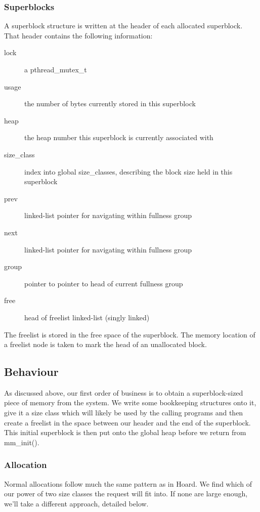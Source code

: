 \documentclass{article}
\begin{document}
\subsubsection{Superblocks}
A superblock structure is written at the header of each allocated superblock.
That header contains the following information:
\begin{description}
    \item[lock] a pthread\_mutex\_t
    \item[usage] the number of bytes currently stored in this superblock
    \item[heap] the heap number this superblock is currently associated with
    \item[size\_class] index into global size\_classes, describing the block
        size held in this superblock
    \item[prev] linked-list pointer for navigating within fullness group
    \item[next] linked-list pointer for navigating within fullness group
    \item[group] pointer to pointer to head of current fullness group
    \item[free] head of freelist linked-list (singly linked)
\end{description}

The freelist is stored in the free space of the superblock. The memory
location of a freelist node is taken to mark the head of an unallocated block.

\subsection {Behaviour}
As discussed above, our first order of business is to obtain a superblock-sized
piece of memory from the system. We write some bookkeeping structures onto it,
give it a size class which will likely be used by the calling programs and then
create a freelist in the space between our header and the end of the
superblock. This initial superblock is then put onto the global heap before we
return from mm\_init().

\subsubsection{Allocation}
Normal allocations follow much the same pattern as in Hoard. We find which of
our power of two size classes the request will fit into. If none are large 
enough, we'll take a different approach, detailed below.
\end{document}
